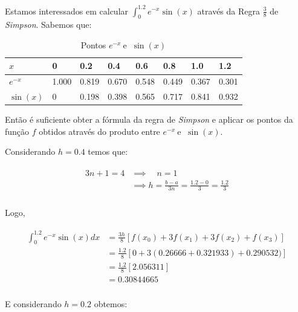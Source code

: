 \documentclass[paper=a4, fontsize=12pt]{scrartcl}
\numberwithin{equation}{section} %
\numberwithin{figure}{section} %
\numberwithin{table}{section} %
\newcommand{\euler}{e}
\begin{document}
		Estamos interessados em calcular $ \int_{0}^{1.2}\euler^{-x}\sin(x) $ através da Regra $ \frac{3}{8} $ de \textit{Simpson}. Sabemos que:

		\begin{table}[H]
			\def\arraystretch{1.5}
			\begin{center}
				\caption{Pontos $\euler^{-x} \ $e $\ \sin(x)$}
				\label{points_ex06}
				\begin{tabularx}
					{\textwidth}{|X|p{1.5cm}|p{1.5cm}|p{1.5cm}|p{1.5cm}|p{1.5cm}|p{1.5cm}|p{1.5cm}|}
					\hline
					{$x$} & 0 & 0.2 	 & 0.4  & 0.6  & 0.8  & 1.0  & 1.2 \\
					\hline
					{$\euler^{-x}$} & 1.000 & 0.819  & 0.670 & 0.548  & 0.449  & 0.367 & 0.301 \\
					\hline
					{$\sin(x)$} & 0 & 0.198 & 0.398  & 0.565 & 0.717   & 0.841  & 0.932 \\
					\hline
				\end{tabularx}
			\end{center}
		\end{table}

		Então é suficiente obter a fórmula da regra de \textit{Simpson} e aplicar os pontos da função $f$ obtidos através do produto entre $\euler^{-x} \ $e $\ \sin(x)$.

		Considerando $h = 0.4$ temos que:

		\begin{align*}
			\begin{split}
				3n + 1 = 4 	&\implies \quad n = 1 \\
				&\implies h = \frac{b - a}{3n} = \frac{1.2 - 0}{3} = \frac{1.2}{3}\\
			\end{split}
		\end{align*}

		Logo,

		\begin{align*}
			\begin{split}
				\int_{0}^{1.2} \euler^{-x}\sin(x)  dx &= \frac{3h}{8}[ f(x_0) + 3f(x_1) + 3f(x_2) + f(x_3)] \\
				&= \frac{1.2}{8}\left[0 + 3(0.26666 + 0.321933) + 0.290532) \right] \\
				&= \frac{1.2}{8}\left[ 2.056311 \right]\\
				&=  0.30844665\\
			\end{split}
		\end{align*}

		E considerando $h = 0.2$ obtemos:
\end{document}
